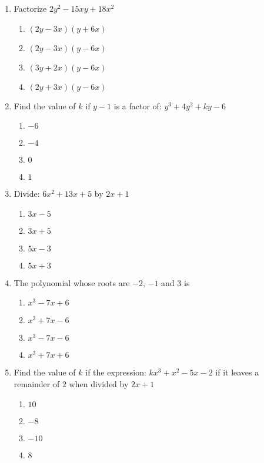 \begin{multicols}{2}
\begin{enumerate}[label={\arabic*.}]
\begin{enumerate}[label={\Alph*.}]
      \end{enumerate}
    \item Factorize \(2y^2 - 15xy + 18x^2\)
      \begin{enumerate}[label={\Alph*.}]
        \item \((2y - 3x)(y + 6x)\)
        \item \((2y -3x)(y-6x)\)
        \item \((3y + 2x )(y -6x)\)
        \item \((2y + 3x)(y-6x)\)
      \end{enumerate}
    \item Find the value of \(k\) if \(y - 1\) is a factor of: \(y^3 + 4y^2 + ky - 6 \)
      \begin{enumerate}[label={\Alph*.}]
        \item \(-6\)
        \item \(-4\)
        \item \(0\)
        \item \(1\)
      \end{enumerate}
    \item Divide: \(6x^2 + 13x + 5\) by \(2x + 1\)
      \begin{enumerate}[label={\Alph*.}]
        \item \(3x -5\)
        \item \(3x + 5\)
        \item \(5x -3\)
        \item \(5x + 3\)
      \end{enumerate}
    \item The polynomial whose roots are \(-2\), \(-1\) and \(3\) is
      \begin{enumerate}[label={\Alph*.}]
        \item \(x^3 - 7x + 6\)
        \item \(x^3 + 7x -6\)
        \item \(x^3 -7x -6\)
        \item \(x^3 +7x +6\)
      \end{enumerate}
    \item Find the value of \(k\) if the expression: \(kx^3 + x^2 -5x -2\) if it  leaves a remainder of \(2\) when divided by \(2x+1\)
      \begin{enumerate}[label={\Alph*.}]
        \item \(10\)
        \item \(-8\)
        \item \(-10\)
        \item \(8\)

\end{enumerate}
\end{enumerate}
\end{multicols}
